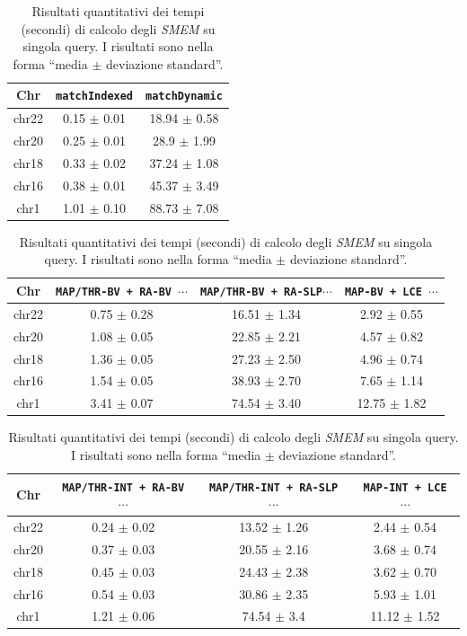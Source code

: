 \begin{table}
  \centering
  \caption{Risultati quantitativi dei tempi (secondi) di calcolo degli
    \textit{SMEM} su singola query. I risultati sono nella forma ``media $\pm$
    deviazione standard''.}  
  \label{tab:exetimesingle}
  \footnotesize
  \begin{tabular}{c||c|c} 
    \textbf{Chr}
    & \textbf{\texttt{matchIndexed}}
    & \textbf{\texttt{matchDynamic}}\\
    \hline
    \hline
    chr22 & 0.15 $\pm$ 0.01 & 18.94 $\pm$ 0.58 \\
    chr20 & 0.25 $\pm$ 0.01 & 28.9 $\pm$ 1.99 \\
    chr18 & 0.33 $\pm$ 0.02 & 37.24 $\pm$ 1.08  \\
    chr16 & 0.38 $\pm$ 0.01 & 45.37 $\pm$ 3.49 \\
    chr1 & 1.01 $\pm$ 0.10 & 88.73 $\pm$ 7.08
  \end{tabular}
  \vspace{+3mm}
  \vspace{+1mm}
  \begin{tabular}{c||c|c|c} 
    \textbf{Chr}
    & \textbf{\texttt{MAP/THR-BV + RA-BV $\cdots$}}
    & \textbf{\texttt{MAP/THR-BV + RA-SLP$\cdots$}}
    & \textbf{\texttt{MAP-BV + LCE $\cdots$}}\\
    \hline
    \hline
    chr22 & 0.75 $\pm$ 0.28 & 16.51 $\pm$ 1.34 & 2.92 $\pm$ 0.55\\
    chr20 & 1.08 $\pm$ 0.05 & 22.85 $\pm$ 2.21 & 4.57 $\pm$ 0.82\\
    chr18 & 1.36 $\pm$ 0.05 & 27.23 $\pm$ 2.50 & 4.96 $\pm$ 0.74 \\
    chr16 & 1.54 $\pm$ 0.05 & 38.93 $\pm$ 2.70 & 7.65 $\pm$ 1.14 \\
    chr1 & 3.41 $\pm$ 0.07 & 74.54 $\pm$ 3.40 & 12.75 $\pm$ 1.82 
  \end{tabular}
  \vspace{+3mm}
  \vspace{+1mm}
  \begin{tabular}{c||c|c|c} 
    \textbf{Chr}
    & \textbf{\texttt{MAP/THR-INT + RA-BV $\cdots$}}
    & \textbf{\texttt{MAP/THR-INT + RA-SLP $\cdots$}}
    & \textbf{\texttt{MAP-INT + LCE $\cdots$}}\\
    \hline
    \hline
    chr22 & 0.24 $\pm$ 0.02 & 13.52 $\pm$ 1.26 & 2.44 $\pm$ 0.54 \\
    chr20 & 0.37 $\pm$ 0.03 & 20.55 $\pm$ 2.16 & 3.68 $\pm$ 0.74 \\
    chr18 & 0.45 $\pm$ 0.03 & 24.43 $\pm$ 2.38 & 3.62 $\pm$ 0.70 \\
    chr16 & 0.54 $\pm$ 0.03 & 30.86 $\pm$ 2.35 & 5.93 $\pm$ 1.01 \\
    chr1 & 1.21 $\pm$ 0.06 & 74.54 $\pm$ 3.4 & 11.12 $\pm$ 1.52


\end{tabular}
\end{table}
